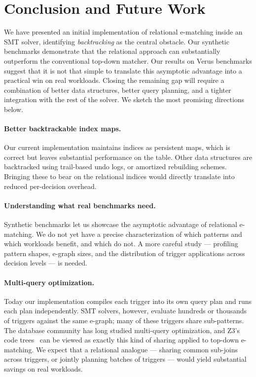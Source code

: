 \section{Conclusion and Future Work}
\label{sec:conclusion}

We have presented an initial implementation of relational e-matching inside an
SMT solver, identifying \emph{backtracking} as the central obstacle. Our
synthetic benchmarks demonstrate that the relational approach can substantially
outperform the conventional top-down matcher. Our results on Verus benchmarks
suggest that it is not that simple to translate this asymptotic advantage into a
practical win on real workloads. Closing the remaining gap will require a
combination of better data structures, better query planning, and a tighter
integration with the rest of the solver. We sketch the most promising directions
below.

\paragraph{Better backtrackable index maps.}
Our current implementation maintains
indices as persistent maps, which is correct but leaves substantial performance
on the table. Other data structures are backtracked using trail-based undo logs, or
amortized rebuilding schemes. Bringing these to bear on the
relational indices would directly translate into reduced per-decision overhead.

\paragraph{Understanding what real benchmarks need.}
Synthetic benchmarks let us showcase the asymptotic advantage of relational
e-matching. We do not yet
have a precise characterization of which patterns and which workloads benefit,
and which do not. A more careful study --- profiling pattern shapes, e-graph sizes,
and the distribution of trigger applications across decision levels --- is needed.

\paragraph{Multi-query optimization.}
Today our implementation compiles each trigger into its own query plan and
runs each plan independently. SMT solvers, however, evaluate hundreds or
thousands of triggers against the same e-graph; many of these triggers share
sub-patterns. The database community has long studied multi-query optimization,
and Z3's code trees~\cite{ematchingz3} can be viewed as exactly this kind of
sharing applied to top-down e-matching. We expect that a relational analogue
--- sharing common sub-joins across triggers, or jointly planning batches of
triggers --- would yield substantial savings on real workloads.

